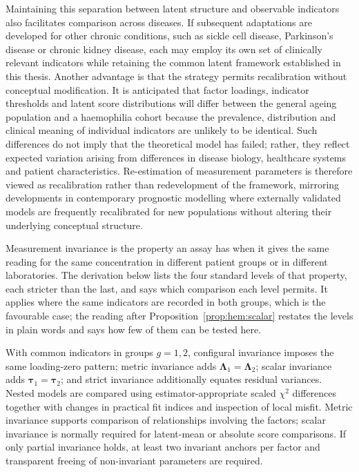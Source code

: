 Maintaining this separation between latent structure and observable indicators also facilitates comparison across diseases. If subsequent adaptations are developed for other chronic conditions, such as sickle cell disease, Parkinson's disease or chronic kidney disease, each may employ its own set of clinically relevant indicators while retaining the common latent framework established in this thesis. Another advantage is that the strategy permits recalibration without conceptual modification. It is anticipated that factor loadings, indicator thresholds and latent score distributions will differ between the general ageing population and a haemophilia cohort because the prevalence, distribution and clinical meaning of individual indicators are unlikely to be identical. Such differences do not imply that the theoretical model has failed; rather, they reflect expected variation arising from differences in disease biology, healthcare systems and patient characteristics. Re-estimation of measurement parameters is therefore viewed as recalibration rather than redevelopment of the framework, mirroring developments in contemporary prognostic modelling where externally validated models are frequently recalibrated for new populations without altering their underlying conceptual structure.

Measurement invariance is the property an assay has when it gives the same reading for the same concentration in different patient groups or in different laboratories. The derivation below lists the four standard levels of that property, each stricter than the last, and says which comparison each level permits. It applies where the same indicators are recorded in both groups, which is the favourable case; the reading after Proposition~\ref{prop:hem:scalar} restates the levels in plain words and says how few of them can be tested here.

\begin{derivation}
\label{der:invariance}
With common indicators in groups $g=1,2$, configural invariance imposes the same
loading-zero pattern; metric invariance adds
$\boldsymbol\Lambda_1=\boldsymbol\Lambda_2$; scalar invariance adds
$\boldsymbol\tau_1=\boldsymbol\tau_2$; and strict invariance additionally equates
residual variances. Nested models are compared using estimator-appropriate scaled
$\chi^2$ differences together with changes in practical fit indices and inspection
of local misfit. Metric invariance supports comparison of relationships involving
the factors; scalar invariance is normally required for latent-mean or absolute
score comparisons. If only partial invariance holds, at least two invariant anchors
per factor and transparent freeing of non-invariant parameters are required.
\end{derivation}

